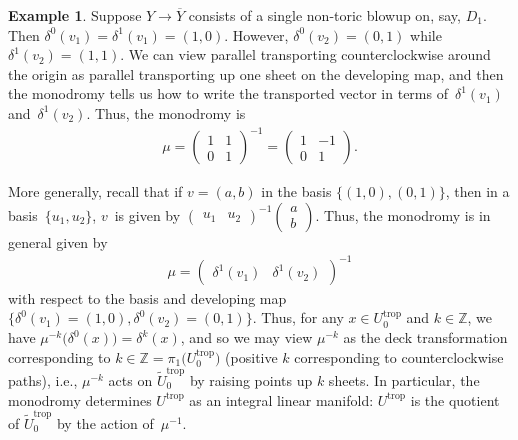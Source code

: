 \documentclass[11pt]{article}
\numberwithin{equation}{section}
\numberwithin{figure}{section}
\numberwithin{table}{section}
\DeclareMathOperator{\trop}{trop}
\let\?=\overline
\let\bb=\mathbb
\let\rar=\rightarrow
\let\wt=\widetilde
\theoremstyle{definition}
\newtheorem{eg}[thm]{Example}
\begin{document}
\begin{eg} \label{focusfocus}Suppose $Y\rar \?{Y}$ consists of a single non-toric blowup on, say, $D_1$. Then $\delta^0(v_1)=\delta^1(v_1)=(1,0)$. However, $\delta^0(v_2) = (0,1)$ while $\delta^1(v_2) = (1,1)$. We can view parallel transporting counterclockwise around the origin as parallel transporting up one sheet on the developing map, and then the monodromy tells us how to write the transported vector in terms of~$\delta^1(v_1)$ and~$\delta^1(v_2)$. Thus, the monodromy is
\begin{gather*}
	\mu=\left(\begin{matrix}
		1 &1 \\
		0 &1
		\end{matrix}\right)^{-1}
	=	\left(\begin{matrix}
		1 &-1 \\
		0 &1
		\end{matrix}\right).	
\end{gather*}
\end{eg}

More generally, recall that if $v=(a,b)$ in the basis $\{(1,0), (0,1)\}$, then in a basis~$\{u_1,u_2\}$, $v$~is given by $\left(\begin{smallmatrix} u_1 & u_2 \end{smallmatrix} \right)^{-1}\left(\begin{smallmatrix} a \\ b \end{smallmatrix} \right)$. Thus, the monodromy is in general given by
\begin{gather*}
 \mu=\left(\begin{matrix}\delta^1(v_{1}) & \delta^1(v_{2}) \end{matrix} \right)^{-1}
\end{gather*} with respect to the basis and developing map $\big\{\delta^0(v_{1})=(1,0),\delta^0(v_{2})=(0,1)\big\}$. Thus, for any \mbox{$x\in U^{\trop}_0$} and $k\in \bb{Z}$, we have $\mu^{-k}\big(\delta^0(x)\big)=\delta^k(x)$, and so we may view $\mu^{-k}$ as the deck transformation corresponding to $k\in \bb{Z}=\pi_1\big(U^{\trop}_0\big)$ (positive $k$ corresponding to counterclockwise paths), i.e., $\mu^{-k}$ acts on $\wt{U}_0^{\trop}$ by raising points up $k$ sheets. In particular, the monodromy determines $U^{\trop}$ as an integral linear manifold: $U^{\trop}$ is the quotient of $\wt{U}_0^{\trop}$ by the action of~$\mu^{-1}$.
\end{document}
